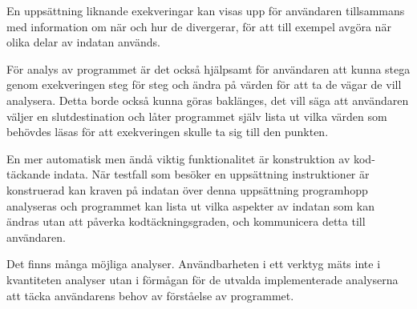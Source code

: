 En uppsättning liknande exekveringar kan visas upp för användaren tillsammans
med information om när och hur de divergerar, för att till exempel avgöra när
olika delar av indatan används.

För analys av programmet är det också hjälpsamt för användaren att kunna stega
genom exekveringen steg för steg och ändra på värden för att ta de vägar de vill
analysera. Detta borde också kunna göras baklänges, det vill säga att användaren
väljer en slutdestination och låter programmet själv lista ut vilka värden som
behövdes läsas för att exekveringen skulle ta sig till den punkten.

En mer automatisk men ändå viktig funktionalitet är konstruktion av kod-täckande
indata. När testfall som besöker en uppsättning instruktioner är konstruerad kan
kraven på indatan över denna uppsättning programhopp analyseras och programmet
kan lista ut vilka aspekter av indatan som kan ändras utan att påverka
kodtäckningsgraden, och kommunicera detta till användaren.

Det finns många möjliga analyser. Användbarheten i ett verktyg mäts inte i
kvantiteten analyser utan i förmågan för de utvalda implementerade analyserna
att täcka användarens behov av förståelse av programmet.
